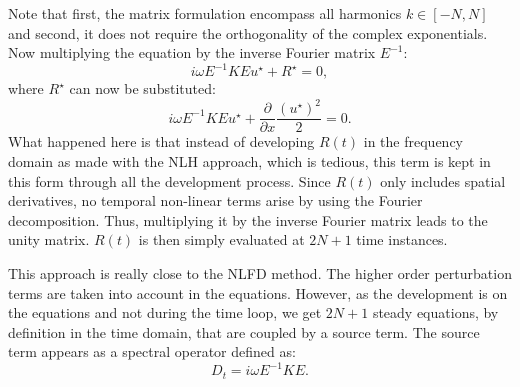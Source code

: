 Note that first, the matrix formulation encompass all harmonics
$k \in [-N, N]$ and second, it does not require the
orthogonality of the complex exponentials.
Now multiplying the equation by the inverse Fourier matrix $E^{-1}$:
\begin{equation}
	i \omega E^{-1} K E u^\star + R^\star = 0,
	\label{eq:sm_hb_matrix_form_mono}
\end{equation}
where $R^\star$ can now be substituted:
\begin{equation}
		i \omega E^{-1} K E u^\star + 
		\displaystyle \frac{\partial}{\partial x}
		\frac{(u^\star)^2}{2} = 0.
\end{equation}
What happened here is that instead of developing $R(t)$
in the frequency domain as made with the NLH approach,
which is tedious, this term is kept
in this form through all the development process. 
Since $R(t)$ only includes spatial derivatives, no temporal non-linear
terms
arise by using the Fourier decomposition. Thus, multiplying it
by the inverse Fourier matrix leads to the unity matrix. 
$R(t)$ is then simply evaluated at $2N+1$ time instances.

This approach is really close to the NLFD method.
The higher order perturbation terms are taken into account
in the equations.
However,
as the development is on the equations and not during the time loop,
we get $2N+1$ steady equations, by definition in the time
domain, that are coupled by a source term.
The source term appears as a spectral operator defined as:
\begin{equation}
	D_t = i \omega E^{-1} K E.
	\label{eq:sm_hb_mono_source_term_matrix}
\end{equation}

